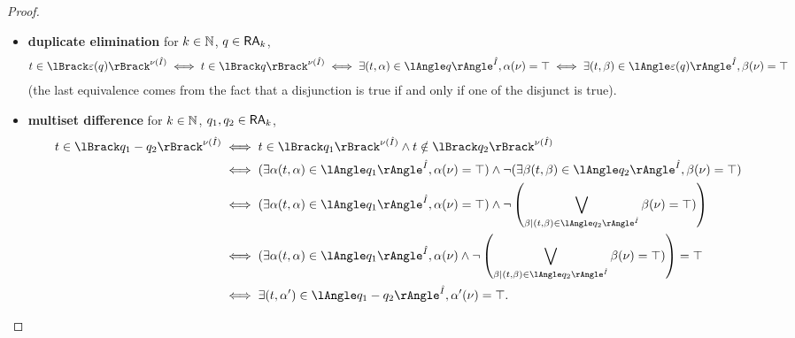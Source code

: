 \begin{proof}
\begin{itemize}
		\item \textbf{duplicate elimination} for $k\in\mathbb{N}$,
			$q\in\mathsf{RA}_k$,
			\begin{align*}
				t\in\sem{\nu(\hat I)}{\epsilon(q)}
				\iff
				t\in\sem{\nu(\hat I)}{q}
				\iff
				\exists (t,\alpha)\in \ansem{\hat I}{q}, \alpha(\nu)=\top
				\iff
				\exists (t,\beta)\in\ansem{\hat I}{\epsilon(q)},
				\beta(\nu)=\top
			\end{align*}
			(the last equivalence comes from the fact that a disjunction is
			true if and only if one of the disjunct is true).

		\item \textbf{multiset difference}
			for $k\in\mathbb{N}$, $q_1,q_2\in\mathsf{RA}_k$,
			\begin{align*}
				t\in\sem{\nu(\hat I)}{q_1-q_2}
				 & \iff
				t\in\sem{\nu(\hat I)}{q_1}\land t\notin\sem{\nu(\hat I)}{q_2} \\
				 & \iff
				(\exists\alpha (t,\alpha)\in\ansem{\hat I}{q_1},
				\alpha(\nu)=\top)\land\lnot
				(\exists \beta (t,\beta)\in\ansem{\hat
				I}{q_2},\beta(\nu)=\top)                                      \\
				 & \iff
				(\exists\alpha (t,\alpha)\in\ansem{\hat I}{q_1},
				\alpha(\nu)=\top)\land\lnot\left(
				\bigvee_{\beta\mid(t,\beta)\in\ansem{\hat I}{q_2}}\beta(\nu)=\top)
				\right)                                                       \\
				 & \iff
				(\exists\alpha (t,\alpha)\in\ansem{\hat I}{q_1},
				\alpha(\nu)\land\lnot\left(
					\bigvee_{\beta\mid(t,\beta)\in\ansem{\hat I}{q_2}}\beta(\nu)=\top)
				\right)=\top                                                  \\
				 & \iff
				\exists(t,\alpha')\in\ansem{\hat I}{q_1-q_2}, \alpha'(\nu)=\top.
				\qedhere
			\end{align*}
	\end{itemize}
\end{proof}
